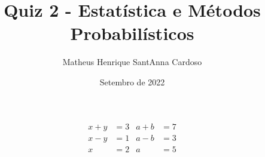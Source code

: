 \documentclass[12pt,a4paper]{article}
\author{Matheus Henrique SantAnna Cardoso}
\title{Quiz 2 - Estatística e Métodos Probabilísticos}
\date{Setembro de 2022}
\begin{document}
\maketitle

\begin{align*}
	x + y &= 3 & a + b &= 7\\
	x - y &= 1 & a - b &= 3\\
	x &= 2 & a &= 5\\
\end{align*}
\end{document}

